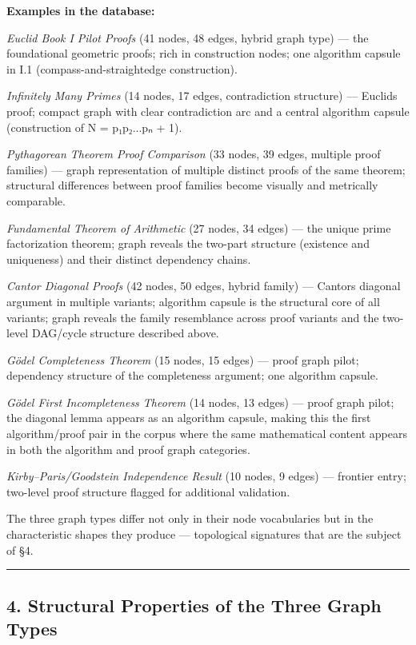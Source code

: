 \documentclass[
  11pt]{article}
\begin{document}
\textbf{Examples in the database:}

\emph{Euclid Book I Pilot Proofs} (41 nodes, 48 edges, hybrid graph
type) --- the foundational geometric proofs; rich in construction nodes;
one algorithm capsule in I.1 (compass-and-straightedge construction).

\emph{Infinitely Many Primes} (14 nodes, 17 edges, contradiction
structure) --- Euclid\textquotesingle s proof; compact graph with clear
contradiction arc and a central algorithm capsule (construction of N =
p₁p₂...pₙ + 1).

\emph{Pythagorean Theorem Proof Comparison} (33 nodes, 39 edges,
multiple proof families) --- graph representation of multiple distinct
proofs of the same theorem; structural differences between proof
families become visually and metrically comparable.

\emph{Fundamental Theorem of Arithmetic} (27 nodes, 34 edges) --- the
unique prime factorization theorem; graph reveals the two-part structure
(existence and uniqueness) and their distinct dependency chains.

\emph{Cantor Diagonal Proofs} (42 nodes, 50 edges, hybrid family) ---
Cantor\textquotesingle s diagonal argument in multiple variants;
algorithm capsule is the structural core of all variants; graph reveals
the family resemblance across proof variants and the two-level DAG/cycle
structure described above.

\emph{Gödel Completeness Theorem} (15 nodes, 15 edges) --- proof graph
pilot; dependency structure of the completeness argument; one algorithm
capsule.

\emph{Gödel First Incompleteness Theorem} (14 nodes, 13 edges) --- proof
graph pilot; the diagonal lemma appears as an algorithm capsule, making
this the first algorithm/proof pair in the corpus where the same
mathematical content appears in both the algorithm and proof graph
categories.

\emph{Kirby--Paris/Goodstein Independence Result} (10 nodes, 9 edges)
--- frontier entry; two-level proof structure flagged for additional
validation.

The three graph types differ not only in their node vocabularies but in
the characteristic shapes they produce --- topological signatures that
are the subject of §4.

\begin{center}\rule{0.5\linewidth}{0.5pt}\end{center}

\hypertarget{4-structural-properties-of-the-three-graph-types}{%
\subsection{4. Structural Properties of the Three Graph
Types}\label{4-structural-properties-of-the-three-graph-types}}
\end{document}
